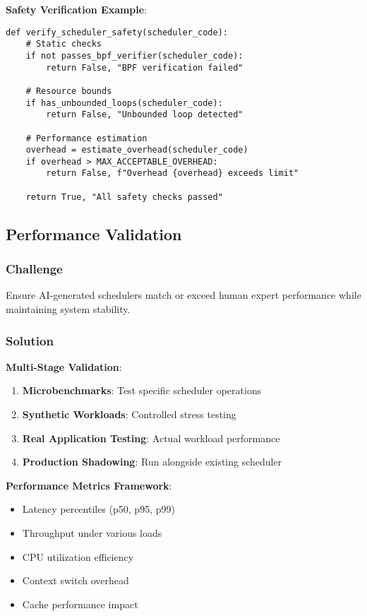 \textbf{Safety Verification Example}:
\begin{verbatim}
def verify_scheduler_safety(scheduler_code):
    # Static checks
    if not passes_bpf_verifier(scheduler_code):
        return False, "BPF verification failed"
    
    # Resource bounds
    if has_unbounded_loops(scheduler_code):
        return False, "Unbounded loop detected"
    
    # Performance estimation
    overhead = estimate_overhead(scheduler_code)
    if overhead > MAX_ACCEPTABLE_OVERHEAD:
        return False, f"Overhead {overhead} exceeds limit"
    
    return True, "All safety checks passed"
\end{verbatim}

\subsection{Performance Validation}

\subsubsection{Challenge}
Ensure AI-generated schedulers match or exceed human expert performance while maintaining system stability.

\subsubsection{Solution}

\textbf{Multi-Stage Validation}:
\begin{enumerate}
\item \textbf{Microbenchmarks}: Test specific scheduler operations
\item \textbf{Synthetic Workloads}: Controlled stress testing
\item \textbf{Real Application Testing}: Actual workload performance
\item \textbf{Production Shadowing}: Run alongside existing scheduler
\end{enumerate}

\textbf{Performance Metrics Framework}:
\begin{itemize}
\item Latency percentiles (p50, p95, p99)
\item Throughput under various loads
\item CPU utilization efficiency
\item Context switch overhead
\item Cache performance impact
\end{itemize}

